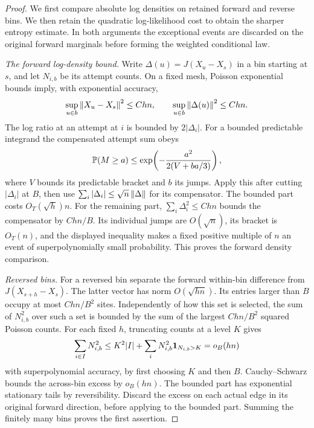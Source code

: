 \begin{proof}
We first compare absolute log densities on retained forward and reverse
bins.  We then retain the quadratic log-likelihood cost to obtain the
sharper entropy estimate.  In both arguments the exceptional events are
discarded on the original forward marginals before forming the weighted
conditional law.

\emph{The forward log-density bound.}
Write $\Delta(u)=J(X_u-X_s)$ in a bin starting at $s$, and let
$N_{i,b}$ be its attempt counts.  On a fixed mesh, Poisson exponential
bounds imply, with exponential accuracy,
\begin{equation}
 \sup_{u\in b}\norm{X_u-X_s}^2\le C hn,
 \qquad
 \sup_{u\in b}\norm{\Delta(u)}^2\le C hn.
 \label{eq:path-bin-square}
\end{equation}
The log ratio at an attempt at $i$ is bounded by $2|\Delta_i|$.
For a bounded predictable integrand the compensated attempt sum obeys
\[
 \P(M\ge a)\le
 \exp\!\left(-\frac{a^2}{2(V+ba/3)}\right),
\]
where $V$ bounds its predictable bracket and $b$ its jumps.  Apply this
after cutting $|\Delta_i|$ at $B$, then use
$\sum_i|\Delta_i|\le\sqrt n\norm\Delta$ for its compensator.
The bounded part costs $O_T(\sqrt h)n$.
For the remaining part, $\sum_i\Delta_i^2\le Chn$ bounds the
compensator by $Chn/B$.  Its individual jumps are $O(\sqrt n)$,
its bracket is $O_T(n)$, and the displayed inequality makes a fixed
positive multiple of $n$ an event of superpolynomially small probability.
This proves the forward density comparison.

\emph{Reversed bins.}
For a reversed bin separate the forward within-bin difference from
$J(X_{s+h}-X_s)$.  The latter vector has norm $O(\sqrt{hn})$.
Its entries larger than $B$ occupy at most $Chn/B^2$ sites.  Independently
of how this set is selected, the sum of $N_{i,b}^2$ over such a set is
bounded by the sum of the largest $Chn/B^2$ squared Poisson counts.
For each fixed $h$, truncating counts at a level $K$ gives
\[
 \sum_{i\in I}N_{i,b}^2
 \le K^2|I|+\sum_iN_{i,b}^2\1_{N_{i,b}>K}
 =o_B(hn)
\]
with superpolynomial accuracy, by first choosing $K$ and then $B$.
Cauchy--Schwarz bounds the across-bin excess by $o_B(hn)$.
The bounded part has exponential stationary tails by reversibility.
Discard the excess on each actual edge in its original forward
direction, before applying  to the bounded
part.  Summing the finitely many bins proves the first assertion.


\end{proof}
